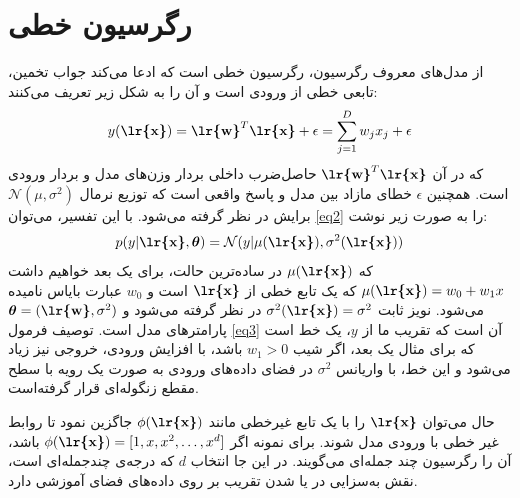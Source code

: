 \documentclass[11.5pt,a4paper]{article}
\begin{document}
 \section{رگرسیون خطی}
 از مدل‌های معروف رگرسیون، رگرسیون خطی است که ادعا می‌کند جواب تخمین، تابعی خطی از ورودی است و آن را به شکل زیر تعریف می‌کنند:
\begin{equation}
\label{eq2}
y(\text{\textbf{\lr{x}}})= {\text{\textbf{\lr{w}}}}^{T}{\text{\textbf{\lr{x}}}} + \epsilon = \sum^{D}_{j=1}{w_j x_j } + \epsilon
\end{equation}
که در آن 
${\text{\textbf{\lr{w}}}}^{T}{\text{\textbf{\lr{x}}}}$
حاصل‌ضرب داخلی بردار وزن‌های مدل و بردار ورودی است. همچنین
 $\epsilon$
  خطای مازاد بین مدل و پاسخ واقعی است که توزیع نرمال 
  $\mathcal{N}(\mu , \sigma^2)$
  برایش در نظر گرفته می‌شود. با این تفسیر، می‌توان \ref{eq2} را به صورت زیر نوشت:
  \begin{equation}
  \label{eq3}
  p(y| \text{\textbf{\lr{x}}}, \boldsymbol{\theta}) = \mathcal{N}(y|\mu (\text{\textbf{\lr{x}}}), \sigma^2(\text{\textbf{\lr{x}}}))
  \end{equation}
  که 
  $\mu (\text{\textbf{\lr{x}}})$
  در ساده‌ترین حالت، برای یک بعد خواهیم داشت 
   $\mu (\text{\textbf{\lr{x}}})= w_0 + w_1 x$
   که یک تابع خطی از
    $\text{\textbf{\lr{x}}}$
    است و
     $w_0$
     عبارت بایاس نامیده می‌شود. نویز ثابت  
    $\sigma^2(\text{\textbf{\lr{x}}})=\sigma^2$
    در نظر گرفته می‌شود و
    $\boldsymbol{\theta}=(\text{\textbf{\lr{w}}},\sigma^2)$ 
    پارامترهای مدل است. توصیف فرمول \ref{eq3} آن است که تقریب ما از $y$، یک خط است که برای مثال یک بعد، اگر شیب 
    $w_1>0$
    باشد، با افزایش ورودی، خروجی نیز زیاد می‌شود و این خط، با واریانس 
    $\sigma^2$
    در فضای داده‌های ورودی به صورت یک رویه با سطح مقطع زنگوله‌ای قرار گرفته‌است. 
    
    حال می‌توان 
    $\text{\textbf{\lr{x}}}$
    را با یک تابع غیرخطی مانند 
    $\phi(\text{\textbf{\lr{x}}})$
    جاگزین نمود تا روابط غیر خطی با ورودی مدل شوند. برای نمونه اگر
    $\phi(\text{\textbf{\lr{x}}}) = [1, x , x^2 , \dots  , x^d ]$
    باشد، آن را رگرسیون چند جمله‌ای می‌گویند. در این جا انتخاب $d$ که درجه‌ی چندجمله‌ای است، نقش به‌سزایی در  یا  شدن تقریب بر روی داده‌های فضای آموزشی دارد. 
 
\end{document}
